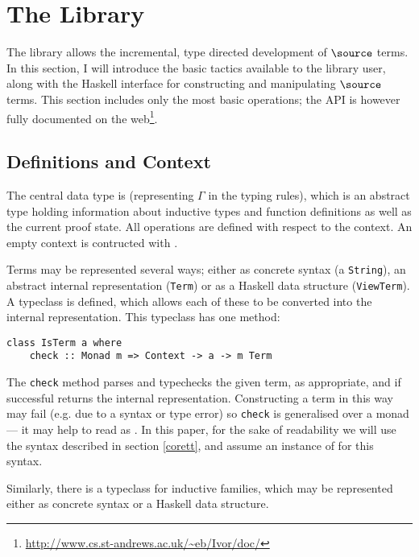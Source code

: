 \section{The \Ivor{} Library}


The \Ivor{} library allows the incremental, type directed development
of $\source$ terms.  In this section, I will introduce the basic
tactics available to the library user, along with the Haskell
interface for constructing and manipulating $\source$ terms. This
section includes only the most basic operations; the API is however
fully documented on the
web\footnote{\url{http://www.cs.st-andrews.ac.uk/~eb/Ivor/doc/}}.

\subsection{Definitions and Context}

The central data type is  (representing $\Gamma$ in the
typing rules), which is an abstract type holding information about
inductive types and function definitions as well as the current proof
state. All operations are defined with respect to the context. An
empty context is contructed with .

Terms may be represented several ways; either as concrete syntax (a
\texttt{String}), an abstract internal representation (\texttt{Term})
or as a Haskell data structure (\texttt{ViewTerm}). A typeclass
 is defined, which allows each of these to be converted
into the internal representation. This typeclass has one method:

\begin{verbatim}
class IsTerm a where
    check :: Monad m => Context -> a -> m Term
\end{verbatim}

The \texttt{check} method parses and typechecks the given term, as
appropriate, and if successful returns the internal representation. 
Constructing a term in this way may fail (e.g. due to a syntax or
type error) so \texttt{check} is generalised over a monad
 --- it may help to read  as .
In this paper, for the sake of readability we will use the syntax
described in section \ref{corett}, and assume an instance of
 for this syntax.

Similarly, there is a typeclass for inductive families,
which may be represented either as concrete syntax or a Haskell data
structure.

